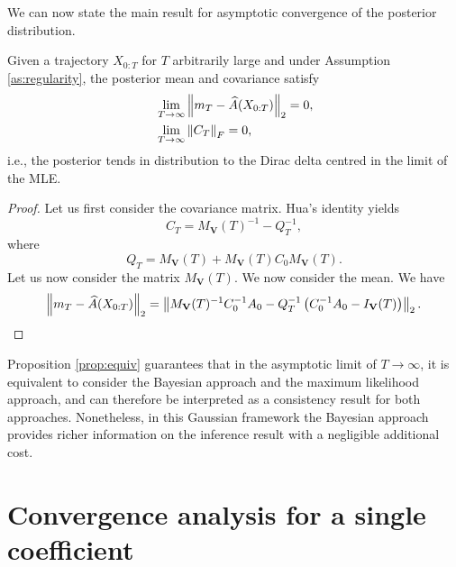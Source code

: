 \documentclass[10pt]{article}
\begin{document}
We can now state the main result for asymptotic convergence of the posterior distribution.
\begin{proposition}\label{prop:equiv} Given a trajectory $X_{0:T}$ for $T$ arbitrarily large and under Assumption \ref{as:regularity}, the posterior mean and covariance satisfy
	\begin{equation}
	\begin{aligned}
		&\lim_{T \to \infty} \left\|m_T - \widehat A(X_{0:T})\right\|_2 = 0, \\
		&\lim_{T \to \infty} \left\|C_T\right\|_F = 0,
	\end{aligned}
	\end{equation}
	i.e., the posterior tends in distribution to the Dirac delta centred in the limit of the MLE.
\end{proposition}
\begin{proof} Let us first consider the covariance matrix. Hua's identity yields
	\begin{equation}
		C_T = M_{\mathbf V}(T)^{-1} - Q_T^{-1},
	\end{equation}
	where 
	\begin{equation}
		Q_T = M_{\mathbf V}(T) + M_{\mathbf V}(T) C_0 M_{\mathbf V}(T).
	\end{equation}
	Let us now consider the matrix $M_{\mathbf V}(T)$. 
	We now consider the mean. We have
	\begin{equation}
		\left\|m_T - \widehat A(X_{0:T})\right\|_2 = \left\|M_{\mathbf V}(T)^{-1}C_0^{-1}A_0 - Q_T^{-1}\left(C_0^{-1}A_0 -I_{\mathbf V}(T) \right)\right\|_2.
	\end{equation}
\end{proof}

\begin{remark} Proposition \ref{prop:equiv} guarantees that in the asymptotic limit of $T \to \infty$, it is equivalent to consider the Bayesian approach and the maximum likelihood approach, and can therefore be interpreted as a consistency result for both approaches. Nonetheless, in this Gaussian framework the Bayesian approach provides richer information on the inference result with a negligible additional cost.
\end{remark}


\section{Convergence analysis for a single coefficient}
\end{document}
